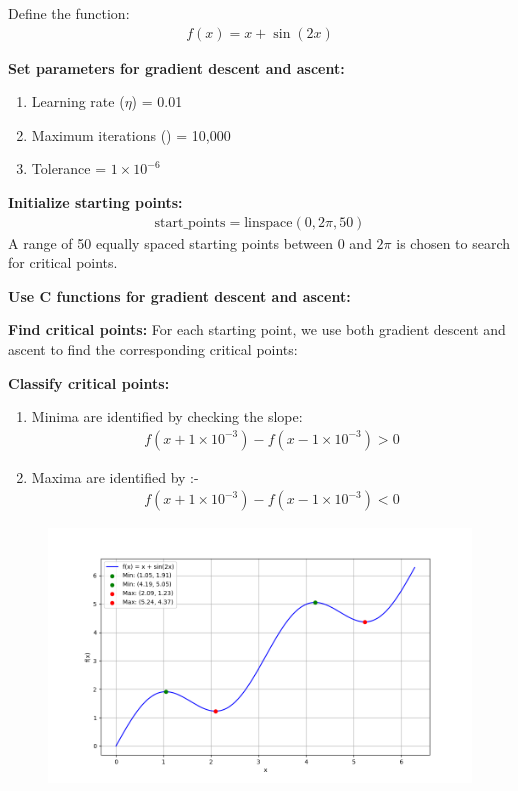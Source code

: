 \documentclass[journal]{IEEEtran}
\numberwithin{equation}{enumi}
\numberwithin{figure}{enumi}
\begin{document}
\begin{enumerate}
Define the function:
    \begin{align}
    f(x) = x + \sin(2x)
    \end{align}

    \textbf{Set parameters for gradient descent and ascent:}
    \begin{enumerate}
        \item Learning rate ($ \eta $) = 0.01
        \item Maximum iterations () = 10,000
        \item Tolerance  = $1 \times 10^{-6}$
    \end{enumerate}
    
    \textbf{Initialize starting points:}
    \begin{align}
    \text{start\_points} = \text{linspace}(0, 2\pi, 50)
    \end{align}
    A range of 50 equally spaced starting points between $0$ and $2\pi$ is chosen to search for critical points.

    \textbf{Use C functions for gradient descent and ascent:}
    
    \textbf{Find critical points:}
    For each starting point, we use both gradient descent and ascent to find the corresponding critical points:

    \textbf{Classify critical points:}
    \begin{enumerate}
        \item Minima are identified by checking the slope:
        \begin{align}
        f(x + 1 \times 10^{-3}) - f(x - 1 \times 10^{-3}) > 0
        \end{align}
        \item Maxima are identified by :-
        \begin{align}
        f(x + 1 \times 10^{-3}) - f(x - 1 \times 10^{-3}) < 0
        \end{align}
    \end{enumerate}
    
\end{enumerate}
\begin{figure}[h!]
   \centering
   \includegraphics[width=0.7\linewidth]{figs/Figure_1.png}
\end{figure}
\end{document}
